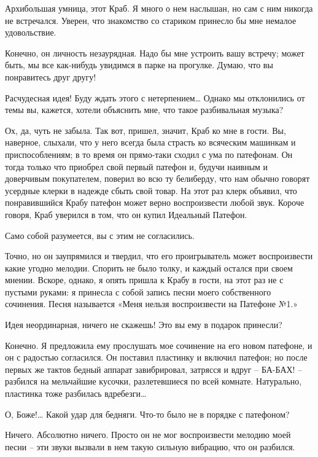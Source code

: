 \documentclass[../main.tex]{subfiles}
\begin{document}
\begin{dialogue}
 {\Large А}рхибольшая умница, этот Краб. Я много о нем наслышан, но сам с ним никогда не встречался. Уверен, что знакомство со стариком принесло бы мне немалое удовольствие.

 Конечно, он личность незаурядная. Надо бы мне устроить вашу встречу; может быть, мы все как-нибудь увидимся в парке на прогулке. Думаю, что вы понравитесь друг другу!

 Расчудесная идея! Буду ждать этого с нетерпением\ldots{} Однако мы отклонились от темы вы, кажется, хотели объяснить мне, что такое разбивальная музыка?

 Ох, да, чуть не забыла. Так вот, пришел, значит, Краб ко мне в гости. Вы, наверное, слыхали, что у него всегда была страсть ко всяческим машинкам и приспособлениям; в то время он прямо-таки сходил с ума по патефонам. Он тогда только что приобрел свой первый патефон и, будучи наивным и доверчивым покупателем, поверил во всю ту белиберду, что нам обычно говорят усердные клерки в надежде сбыть свой товар. На этот раз клерк объявил, что понравившийся Крабу патефон может верно воспроизвести любой звук. Короче говоря, Краб уверился в том, что он купил Идеальный Патефон.

 Само собой разумеется, вы с этим не согласились.

 Точно, но он заупрямился и твердил, что его проигрыватель может воспроизвести какие угодно мелодии. Спорить не было толку, и каждый остался при своем мнении. Вскоре, однако, я опять пришла к Крабу в гости, на этот раз не с пустыми руками: я принесла с собой запись песни моего собственного сочинения. Песня называется «Меня нельзя воспроизвести на Патефоне №1.»

 Идея неординарная, ничего не скажешь! Это вы ему в подарок принесли?

 Конечно. Я предложила ему прослушать мое сочинение на его новом патефоне, и он с радостью согласился. Он поставил пластинку и включил патефон; но после первых же тактов бедный аппарат завибрировал, затрясся и вдруг \--- БА-БАХ! \--- разбился на мельчайшие кусочки, разлетевшиеся по всей комнате. Натурально, пластинка тоже разбилась вдребезги\ldots{}

 О, Боже!\ldots{} Какой удар для бедняги. Что-то было не в порядке с патефоном?

 Ничего. Абсолютно ничего. Просто он не мог воспроизвести мелодию моей песни \--- эти звуки вызвали в нем такую сильную вибрацию, что он разбился.


\end{dialogue}
\end{document}
